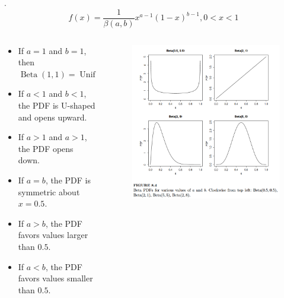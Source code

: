 \documentclass[8pt]{beamer}
\newcommand{\Unif}[2]{\operatorname{Unif}\!\left(#1, #2\right)}
\newcommand{\Beta}[2]{\operatorname{Beta}\!\left(#1, #2\right)}
\begin{document}
\begin{frame}{.}
    \[
        f(x) = \frac{1}{\beta (a,b)} x^{a-1} (1-x)^{b-1}, 0<x<1
    \]
    \begin{columns}
        \begin{column}{0.4\textwidth}
            \begin{itemize}
                \item If $a=1$ and $b=1$, then $\Beta{1}{1} = \Unif{0}{1}$
                \item If $a<1$ and $b <1$, the PDF is U-shaped and opens upward.
                \item If $a>1$ and $a>1$, the PDF opens down.
                \item If $a=b$, the PDF is symmetric about $x= 0.5$.
                \item If $a>b$, the PDF favors values larger than $0.5$.
                \item If $a<b$, the PDF favors values smaller than $0.5$.
            \end{itemize}
        \end{column}

        \begin{column}{0.6\textwidth}
            \begin{figure}
                \includegraphics[width=1.0\textwidth]{BetaDists.png}
            \end{figure}
        \end{column}
    \end{columns}

\end{frame}
\end{document}
